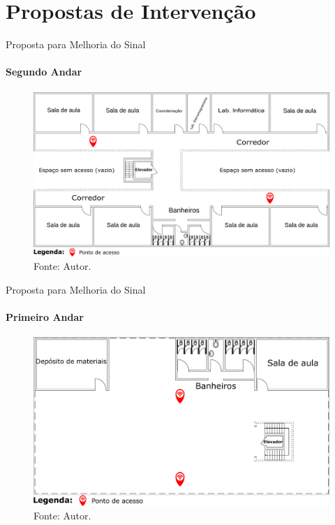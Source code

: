 \documentclass[aspectratio=169,12pt]{beamer}
\begin{document}
\section{Propostas de Intervenção}
\begin{frame}{Proposta para Melhoria do Sinal}
	\framesubtitle{Segundo Andar}
	\begin{figure}[H]
		\centering
		\includegraphics[scale=0.13]{fig_tcc/APs_Bloco_Andar_2_Proposta_Intervencao.pdf}
		\caption*{{\fontsize{8pt}{11}\selectfont Fonte: Autor.}}
	\end{figure}
\end{frame}
\begin{frame}{Proposta para Melhoria do Sinal}
	\framesubtitle{Primeiro Andar}
	\begin{figure}[H]
		\centering
		\includegraphics[scale=0.17]{fig_tcc/APs_Bloco_Andar_1_Proposta_Intervencao.pdf}
		\caption*{{\fontsize{8pt}{11}\selectfont Fonte: Autor.}}
	\end{figure}
\end{frame}
\end{document}
